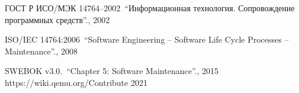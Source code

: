 
\pagebreak
\begin{thebibliography}{1}
     ГОСТ Р ИСО/МЭК 14764--2002\ \enquote{Информационная технология. Сопровождение программных средств}., 2002

     ISO/IEC 14764:2006\ \enquote{Software Engineering -- Software Life Cycle Processes -- Maintenance}., 2008

     SWEBOK v3.0.\ \enquote{Chapter 5: Software Maintenance}., 2015
     https://wiki.qemu.org/Contribute 2021
\end{thebibliography}
